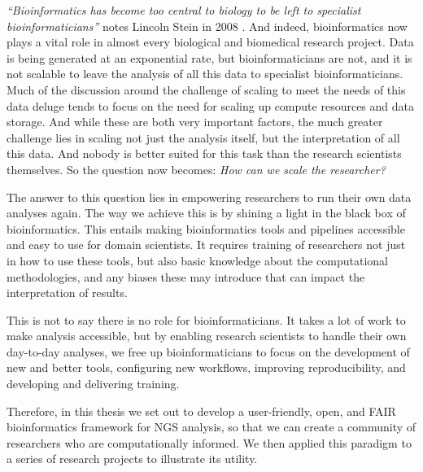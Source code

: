 \emph{``Bioinformatics has become too central to biology to be left to specialist bioinformaticians''} notes Lincoln Stein in 2008 \cite{stein2008bioinformatics}.
And indeed, bioinformatics now plays a vital role in almost every biological and biomedical research project.
Data is being generated at an exponential rate, but bioinformaticians are not,  and it is not scalable to leave the analysis of all this data to specialist bioinformaticians.
Much of the discussion around the challenge of scaling to meet the needs of this data deluge tends to focus on the need for scaling up compute resources and data storage.
And while these are both very important factors, the much greater challenge lies in scaling not just the analysis itself, but the interpretation of all this data.
And nobody is better suited for this task than the research scientists themselves. So the question now becomes: \emph{How can we scale the researcher?}

The answer to this question lies in empowering researchers to run their own data analyses again.
The way we achieve this is by shining a light in the black box of bioinformatics.
This entails making bioinformatics tools and pipelines accessible and easy to use for domain scientists.
It requires training of researchers not just in how to use these tools, but also basic knowledge about the computational methodologies, and any biases these may introduce that can impact the interpretation of results.

This is not to say there is no role for bioinformaticians.
It takes a lot of work to make analysis accessible, but by enabling research scientists to handle their own day-to-day analyses, we free up bioinformaticians to focus on the development of new and better tools, configuring new workflows, improving reproducibility, and developing and delivering training.

Therefore, in this thesis we set out to develop a user-friendly, open, and FAIR bioinformatics framework for NGS analysis, so that we can create a community of researchers who are computationally informed.
We then applied this paradigm to a series of research projects to illustrate its utility.



